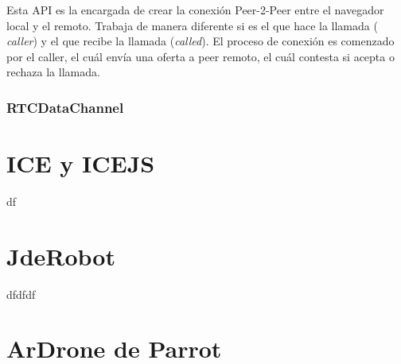 Esta API es la encargada de crear la conexión Peer-2-Peer entre el navegador local y el remoto. Trabaja de manera diferente si es el que hace la llamada ( \textit{caller}) y el que recibe la llamada (\textit{called}). El proceso de conexión es comenzado por el caller, el cuál envía una oferta a peer remoto, el cuál contesta si acepta o rechaza la llamada.

\subsubsection{RTCDataChannel}


\section{ICE y ICEJS}

df

\section{JdeRobot}

dfdfdf

\section{ArDrone de Parrot}

